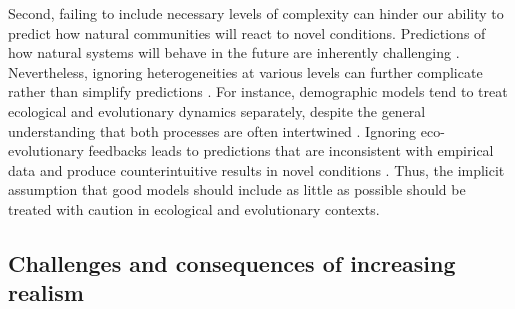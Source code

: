 \begin{refsection}
Second, failing to include necessary levels of complexity can hinder our ability to predict how natural communities will react to novel conditions. Predictions of how natural systems will behave in the future are inherently challenging \citep{sutherland2006predicting}. Nevertheless, ignoring heterogeneities at various levels can further complicate rather than simplify predictions \citep{d2018translucent}. For instance, demographic models tend to treat ecological and evolutionary dynamics separately, despite the general understanding that both processes are often intertwined \citep{macarthur1962some,kokko2007ecogenetic}. Ignoring eco-evolutionary feedbacks leads to predictions that are inconsistent with empirical data and produce counterintuitive results in novel conditions \citep{kokko2007ecogenetic}. Thus, the implicit assumption that good models should include as little as possible should be treated with caution in ecological and evolutionary contexts.



\subsection*{Challenges and consequences of increasing realism}


\end{refsection}
